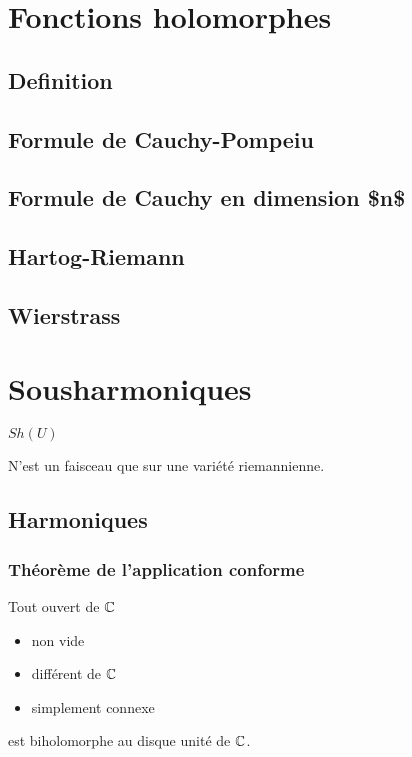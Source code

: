 \section{Fonctions 
holomorphes}

\subsection{Definition}

\subsection{Formule de Cauchy-Pompeiu}

\subsection{Formule de Cauchy en dimension \$n\$}

\subsection{Hartog-Riemann}

\subsection{Wierstrass}

\section{Sousharmoniques}
$Sh(U)$

N'est un faisceau que sur une variété riemannienne.

\subsection{Harmoniques}

\subsubsection{Théorème 
de l'application
conforme}

\begin{thm}
Tout ouvert de $\mathbb{C}$
\begin{itemize}
\item non vide
\item différent de $\mathbb{C}$
\item simplement connexe
\end{itemize}
 est biholomorphe au disque unité de $\mathbb{C}$.
\end{thm}


